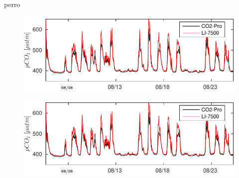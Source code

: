 \documentclass[12pt,a4paper]{article}
\author{Carlos Francisco Herrera V\'azquez}
\begin{document}
perro
\begin{figure}
\includegraphics[page=1,width = \textwidth]{text23.pdf}
\end{figure}

\begin{figure}
\includegraphics[page=2,width = \textwidth]{text23.pdf}
\end{figure}
\end{document}
